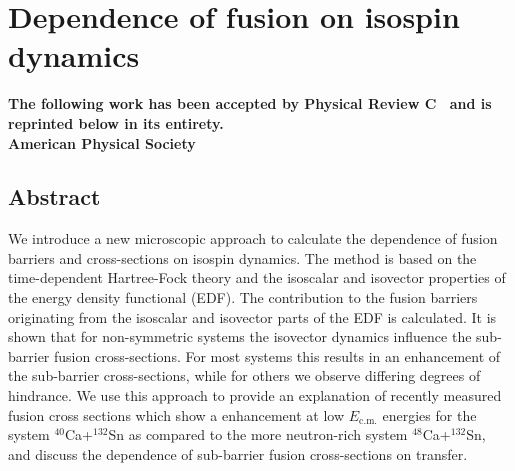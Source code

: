 
\makeatletter
\renewcommand{\AB@affillist}{}
\renewcommand{\AB@authlist}{}
\setcounter{authors}{0}
\setcounter{affil}{0}
\makeatother

\chapter{Dependence of fusion on isospin dynamics}\label{chapters:chapter_2}


{

\author[1]{K. Godbey}
\author[1]{A.S. Umar}

\author[2]{C. Simenel}


	\bfseries\centering

	\makeatletter

		\AB@authlist
		
		\AB@affillist

	\makeatother
	\bfseries
	\vspace{1em}
		The following work has been accepted by Physical Review C~\citep{godbey2017} and is reprinted below in its entirety.\\
	 American Physical Society\\
}
\makeatletter
\renewcommand{\AB@affillist}{}
\renewcommand{\AB@authlist}{}
\setcounter{authors}{0}
\makeatother





\section{Abstract}
	We introduce a new microscopic approach to calculate the dependence of fusion barriers and cross-sections on
	isospin dynamics. The method is based on the time-dependent Hartree-Fock theory and
	the isoscalar and isovector properties of the energy density functional (EDF). The contribution to
	the fusion barriers originating from the isoscalar and isovector parts of the EDF is calculated.
	It is shown that for non-symmetric systems the isovector dynamics influence the sub-barrier fusion
	cross-sections. For most systems this results in an enhancement of the sub-barrier cross-sections,
	while for others we observe differing degrees of hindrance.
	We use this approach to provide an explanation of recently measured fusion cross sections which show a  enhancement at low $E_\mathrm{c.m.}$ energies
	for the system $^{40}$Ca+$^{132}$Sn as compared to the more neutron-rich system
	$^{48}$Ca+$^{132}$Sn, and discuss the dependence of sub-barrier fusion cross-sections on transfer.
	

